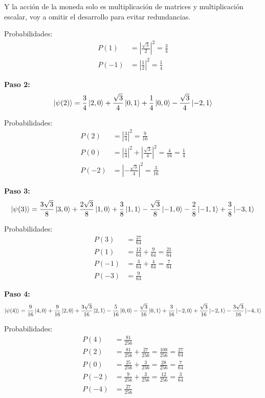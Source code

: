 Y la acción de la moneda solo es multiplicación de matrices y multiplicación escalar, voy a omitir
el desarrollo para evitar redundancias.

Probabilidades:
\begin{align*}
P(1) &= \left| \frac{\sqrt{3}}{2} \right|^2 = \frac{3}{4} \\
P(-1) &= \left| \frac{1}{2} \right|^2 = \frac{1}{4}
\end{align*}

\textbf{Paso 2:}
\begin{equation*}
\ket{\psi(2)} = \frac{3}{4}\ket{2,0} + \frac{\sqrt{3}}{4}\ket{0,1} + \frac{1}{4}\ket{0,0} - \frac{\sqrt{3}}{4}\ket{-2,1}
\end{equation*}

Probabilidades:
\begin{align*}
P(2) &= \left| \frac{3}{4} \right|^2 = \frac{9}{16} \\
P(0) &= \left| \frac{1}{4} \right|^2 + \left| \frac{\sqrt{3}}{4} \right|^2 = \frac{4}{16} = \frac{1}{4} \\
P(-2) &= \left| -\frac{\sqrt{3}}{4} \right|^2 = \frac{3}{16}
\end{align*}

\textbf{Paso 3:}
\begin{equation*}
\ket{\psi(3)} = \frac{3\sqrt{3}}{8}\ket{3,0} + \frac{2\sqrt{3}}{8}\ket{1,0} + \frac{3}{8}\ket{1,1} - \frac{\sqrt{3}}{8}\ket{-1,0} - \frac{2}{8}\ket{-1,1} + \frac{3}{8}\ket{-3,1}
\end{equation*}

Probabilidades:
\begin{align*}
P(3) &= \frac{27}{64} \\
P(1) &= \frac{12}{64} + \frac{9}{64} = \frac{21}{64} \\
P(-1) &= \frac{3}{64} + \frac{4}{64} = \frac{7}{64} \\
P(-3) &= \frac{9}{64}
\end{align*}

\textbf{Paso 4:}
\begin{equation*}
\ket{\psi(4)} = \frac{9}{16}\ket{4,0} + \frac{9}{16}\ket{2,0} + \frac{3\sqrt{3}}{16}\ket{2,1} - \frac{5}{16}\ket{0,0} - \frac{\sqrt{3}}{16}\ket{0,1} + \frac{3}{16}\ket{-2,0} + \frac{\sqrt{3}}{16}\ket{-2,1} - \frac{3\sqrt{3}}{16}\ket{-4,1}
\end{equation*}

Probabilidades:
\begin{align*}
P(4) &= \frac{81}{256} \\
P(2) &= \frac{81}{256} + \frac{27}{256} = \frac{108}{256} = \frac{27}{64} \\
P(0) &= \frac{25}{256} + \frac{3}{256} = \frac{28}{256} = \frac{7}{64} \\
P(-2) &= \frac{9}{256} + \frac{3}{256} = \frac{12}{256} = \frac{3}{64} \\
P(-4) &= \frac{27}{256}
\end{align*}

